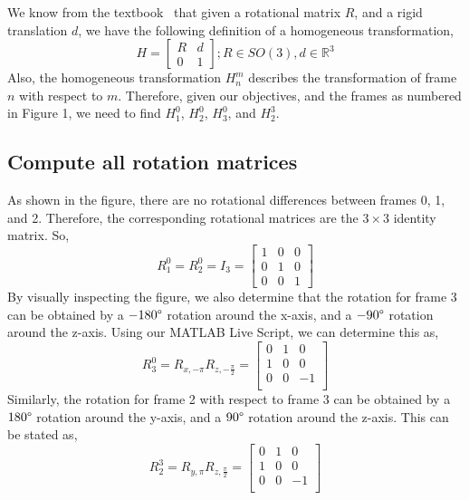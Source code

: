 \documentclass[conference]{IEEEtran}
\begin{document}
We know from the textbook~\cite{Spong2006} that given a rotational matrix $R$, and
a rigid translation $d$, we have the following definition of
a homogeneous transformation,
\[
    H = \begin{bmatrix}
        R & d\\
        0 & 1
    \end{bmatrix}; R \in SO(3), d \in \mathbb{R}^3
\]
Also, the homogeneous transformation $H^m_n$ describes the transformation
of frame $n$ with respect to $m$.
Therefore, given our objectives, and the frames as numbered in Figure 1, 
we need to find $H^0_1$, $H^0_2$, $H^0_3$, and $H^3_2$.

\subsection{Compute all rotation matrices}
As shown in the figure, there are no rotational differences between frames
0, 1, and 2. Therefore, the corresponding rotational matrices are the
$3 \times 3$ identity matrix. So,
\[
    R^0_1 = R^0_2 = I_3 = \begin{bmatrix}
        1 & 0 & 0\\
        0 & 1 & 0\\
        0 & 0 & 1
    \end{bmatrix}
\]
By visually inspecting the figure, we also determine that the rotation for frame 3
can be obtained by a $-180\degree$ rotation around the x-axis, and a
$-90\degree$ rotation around the z-axis. Using our MATLAB Live Script,
we can determine this as,
\[
    R^0_3 = R_{x,-\pi} R_{z,-\frac{\pi}{2}} = \begin{bmatrix}
        0 & 1 & 0\\
        1 & 0 & 0\\
        0 & 0 & -1\\
    \end{bmatrix}
\]
Similarly, the rotation for frame 2 with respect to frame 3 can be obtained
by a $180\degree$ rotation around the y-axis, and a $90\degree$ rotation around
the z-axis. This can be stated as,
\[
    R^3_2 = R_{y,\pi}R_{z,\frac{\pi}{2}} = \begin{bmatrix}
        0 & 1 & 0\\
        1 & 0 & 0\\
        0 & 0 & -1\\
    \end{bmatrix}
\]
\end{document}
